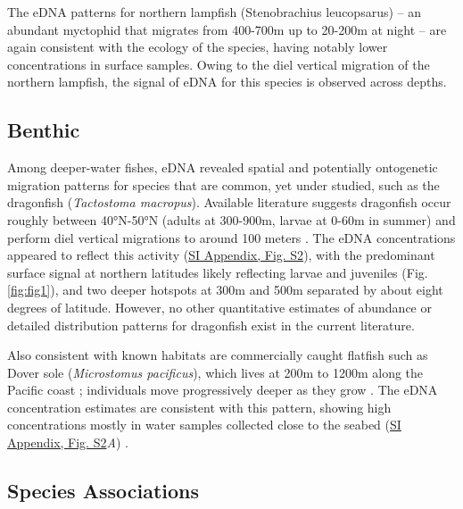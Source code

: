 \documentclass{article}
\begin{document}
The eDNA patterns for northern lampfish (Stenobrachius leucopsarus) -- an abundant myctophid that migrates from 400-700m up to 20-200m at night \cite{moku2000,suntsov2008} -- are again consistent with the ecology of the species, having notably lower concentrations in surface samples. Owing to the diel vertical migration of the northern lampfish, the signal of eDNA for this species is observed across depths.

\subsection*{Benthic}
Among deeper-water fishes, eDNA revealed spatial and potentially ontogenetic migration patterns for species that are common, yet under studied, such as the dragonfish (\textit{Tactostoma macropus}). Available literature suggests dragonfish occur roughly between 40°N-50°N (adults at 300-900m, larvae at 0-60m in summer) \cite{kawaguchi1993} and perform diel vertical migrations to around 100 meters \cite{kawaguchi1993,willis1982}. The eDNA concentrations appeared to reflect this activity (\href{SI_Appendix.pdf}{SI Appendix, Fig. S2}), with the predominant surface signal at northern latitudes likely reflecting larvae and juveniles (Fig. \ref{fig:fig1}), and two deeper hotspots at 300m and 500m separated by about eight degrees of latitude. However, no other quantitative estimates of abundance or detailed distribution patterns for dragonfish exist in the current literature.

Also consistent with known habitats are commercially caught flatfish such as Dover sole (\textit{Microstomus pacificus}), which lives at 200m to 1200m along the Pacific coast \cite{drazen2007,brodziak2000,drazen2012}; individuals move progressively deeper as they grow \cite{vetter1994,hunter1990}. The eDNA concentration estimates are consistent with this pattern, showing high concentrations mostly in water samples collected close to the seabed (\href{SI_Appendix.pdf}{SI Appendix, Fig. S2}\textit{A}) \cite{ono2016}.

\subsection*{Species Associations}
\end{document}
